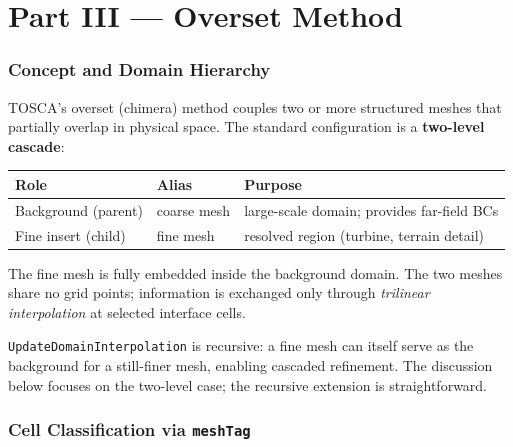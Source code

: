 \documentclass[12pt,a4paper]{article}
\begin{document}
\part*{Part III — Overset Method}

\section{Concept and Domain Hierarchy}
\label{sec:overset-concept}

TOSCA's overset (chimera) method couples two or more structured meshes that
partially overlap in physical space.
The standard configuration is a \textbf{two-level cascade}:

\begin{center}
\begin{tabular}{lll}
\toprule
\textbf{Role} & \textbf{Alias} & \textbf{Purpose} \\
\midrule
Background (parent) & coarse mesh & large-scale domain; provides far-field BCs \\
Fine insert (child)  & fine mesh   & resolved region (turbine, terrain detail) \\
\bottomrule
\end{tabular}
\end{center}

The fine mesh is fully embedded inside the background domain.  The two
meshes share no grid points; information is exchanged only through
\emph{trilinear interpolation} at selected interface cells.

\begin{notebox}
  \texttt{UpdateDomainInterpolation} is recursive: a fine mesh can
  itself serve as the background for a still-finer mesh, enabling
  cascaded refinement.  The discussion below focuses on the two-level
  case; the recursive extension is straightforward.
\end{notebox}

\section{Cell Classification via \texttt{meshTag}}
\label{sec:overset-meshtag}
\end{document}
